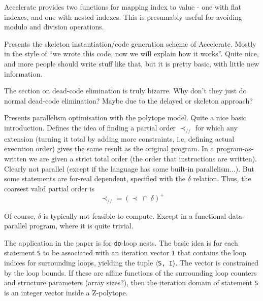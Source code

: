 \documentclass[a4paper, oneside, final]{memoir}
\begin{document}
Accelerate provides two functions for mapping index to value - one
with flat indexes, and one with nested indexes.  This is presumably
useful for avoiding modulo and division operations.

\begin{quote}
\end{quote}

Presents the skeleton instantiation/code generation scheme of
Accelerate.  Mostly in the style of ``we wrote this code, now we will
explain how it works''.  Quite nice, and more people should write
stuff like that, but it is pretty basic, with little new information.

The section on dead-code elimination is truly bizarre.  Why don't they
just do normal dead-code elimination?  Maybe due to the delayed or
skeleton approach?

\begin{quote}
\end{quote}

Presents parallelism optimisation with the polytope model.  Quite a
nice basic introduction.  Defines the idea of finding a partial order
$\prec_{//}$ for which any extension (turning it total by adding more
constraints, i.e, defining actual execution order) gives the same
result as the original program.  In a program-as-written we are given
a strict total order (the order that instructions are written).
Clearly not parallel (except if the language has some built-in
parallelism...).  But some statements are for-real dependent,
specified with the $\delta$ relation.  Thus, the coarsest valid
partial order is
\[
\prec_{//} = (\prec\ \cap\ \delta)^{+}
\]

Of course, $\delta$ is typically not feasible to compute.  Except in a
functional data-parallel program, where it is quite trivial.

The application in the paper is for \texttt{do}-loop nests.  The basic
idea is for each statement \texttt{S} to be associated with an
iteration vector \texttt{I} that contains the loop indices for
surrounding loops, yielding the tuple \texttt{$\langle$S, I$\rangle$}.
The vector is constrained by the loop bounds.  If these are affine
functions of the surrounding loop counters and structure parameters
(array sizes?), then the iteration domain of statement \texttt{S} is
an integer vector inside a Z-polytope.

\begin{quote}
\end{quote}
\end{document}
